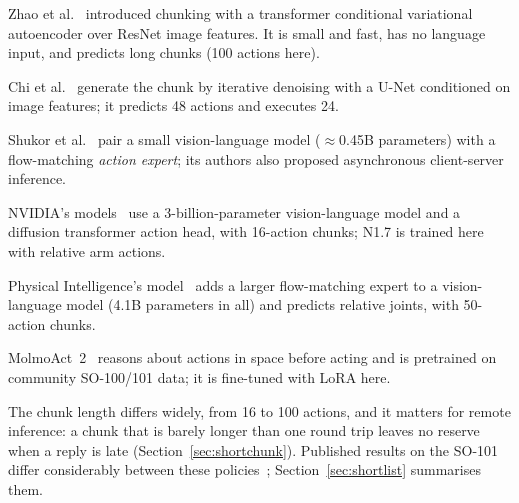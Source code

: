 \begin{description}[style=nextline, leftmargin=0pt]
\item[ACT] Zhao et al.~\cite{zhao2023act} introduced chunking with a transformer conditional variational autoencoder over ResNet
  image features. It is small and fast, has no language input, and predicts long chunks (100 actions here).
\item[Diffusion Policy] Chi et al.~\cite{chi2023diffusion} generate the chunk by iterative denoising with a U-Net conditioned on
  image features; it predicts 48 actions and executes 24.
\item[\smolvla] Shukor et al.~\cite{shukor2025smolvla} pair a small vision-language model ($\approx$0.45B parameters) with a
  flow-matching \emph{action expert}; its authors also proposed asynchronous client-server inference.
\item[GR00T N1.5 and N1.7] NVIDIA's models~\cite{nvidia2025gr00t} use a 3-billion-parameter vision-language model and a diffusion
  transformer action head, with 16-action chunks; N1.7 is trained here with relative arm actions.
\item[\pizerofive] Physical Intelligence's model~\cite{pi2025pi05} adds a larger flow-matching expert to a vision-language model (4.1B parameters in all) and
  predicts relative joints, with 50-action chunks.
\item[MolmoAct 2] MolmoAct~2~\cite{molmoact2} reasons about actions in space before acting and is pretrained on community
  SO-100/101 data; it is fine-tuned with LoRA here.
\end{description}
The chunk length differs widely, from 16 to 100 actions, and it matters for remote inference: a chunk that is barely
longer than one round trip leaves no reserve when a reply is late (Section~\ref{sec:shortchunk}). Published results on
the SO-101 differ considerably between these policies~\cite{armnetbench,so101failure,valloss2026};
Section~\ref{sec:shortlist} summarises them.

